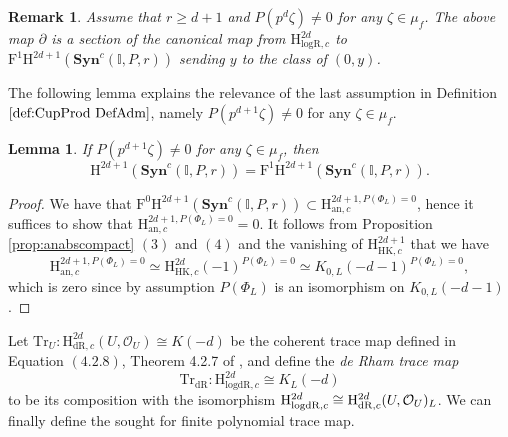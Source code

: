 \documentclass[asterisque,english]{smfart}
\newtheorem{lemma}[theo]{Lemma}
\newtheorem{remark}[theo]{Remark}
\newcommand{\ges}{\geqslant}
\begin{document}
\begin{remark}
Assume that $r\ges d+1$ and $P\left( p^{d}\zeta \right) \neq 0$ for any $%
\zeta \in \mu _{f}$. The above map $\partial $ is a section of the canonical
map from $\mathrm{H}_{\mathrm{logR},c}^{2d}$ to $\mathrm{F}^{1}\mathrm{H}%
^{2d+1}\left( \mathbf{Syn}^{c}\left( \mathbb{I},P,r\right) \right) $ sending 
$y$ to the class of $\left(0,y\right) $.
\end{remark}

The following lemma explains the relevance of the last assumption in Definition $\ref{def:CupProd DefAdm}$, namely $P\left( p^{d+1}\zeta \right) \neq 0$ for any $\zeta \in \mu _{f}$.

\begin{lemma}
\label{lemma:CupProd L1 Trace}If $P\left( p^{d+1}\zeta \right) \neq 0$ for
any $\zeta \in \mu _{f}$, then%
\[
\mathrm{H}^{2d+1}\left( \mathbf{Syn}^{c}\left( \mathbb{I},P,r\right) \right)
=\mathrm{F}^{1}\mathrm{H}^{2d+1}\left( \mathbf{Syn}^{c}\left( \mathbb{I}%
,P,r\right) \right) \text{.}
\]
\end{lemma}

\begin{proof}
We have that $\mathrm{F}^{0}\mathrm{H}^{2d+1}\left( \mathbf{Syn}^{c}\left( 
\mathbb{I},P,r\right) \right) \subset \mathrm{H}_{\mathrm{an}%
,c}^{2d+1,P\left( \Phi _{L}\right) =0}$, hence it suffices to show that 
$\mathrm{H}_{\mathrm{an},c}^{2d+1,P\left( \Phi _{L}\right) =0}=0$. It
follows from Proposition \ref{prop:anabscompact} $\left( 3\right) $ and $%
\left( 4\right) $ and the vanishing of $\mathrm{H}_{\mathrm{HK},c}^{2d+1}$
that we have $$\mathrm{H}_{\mathrm{an},c}^{2d+1,P\left( \Phi _{L}\right)
=0}\simeq \mathrm{H}_{\mathrm{HK},c}^{2d}\left( -1\right) ^{P\left( \Phi
_{L}\right) =0}\simeq K_{0,L}\left(
-d-1\right) ^{P\left( \Phi _{L}\right) =0},$$
which is zero since by assumption 
$P\left( \Phi _{L}\right) $ is an isomorphism on $K_{0,L}\left( -d-1\right) $.
\end{proof}





Let $\mathrm{Tr}%
_{U}\colon \mathrm{H}_{\mathrm{dR},c}^{2d}(U,\mathcal{O}_{U})\cong K(-d)$ be the
coherent trace map defined in Equation $(4.2.8)$, Theorem 4.2.7 of \cite{LLZ}, and define the \emph{de Rham trace map} $$\mathrm{Tr}_{\mathrm{dR%
}}\colon \mathrm{H}_{\mathrm{logdR},c}^{2d}\cong K_{L}\left( -d\right)$$
to be its composition with the isomorphism $\mathrm{H}_{\mathrm{logdR},c}^{2d}\cong{}\mathrm{H}_{\mathrm{dR},c}^{2d}(U,\mathcal{%
O}_{U})_{L}$.
We can finally define the sought for finite polynomial trace map. 
\end{document}
